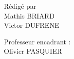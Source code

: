 {

\begin{center}
	\begin{minipage}{0.4\textwidth}
		\begin{flushleft} \large
        	\noindent Rédigé par\\ %
			Mathis BRIARD \\
			Victor DUFRENE
		\end{flushleft}
	\end{minipage}
	\begin{minipage}{0.4\textwidth}
		\begin{flushright}\large
			Professeur encadrant : \\Olivier PASQUIER
		\end{flushright}
	\end{minipage}
\end{center}
}